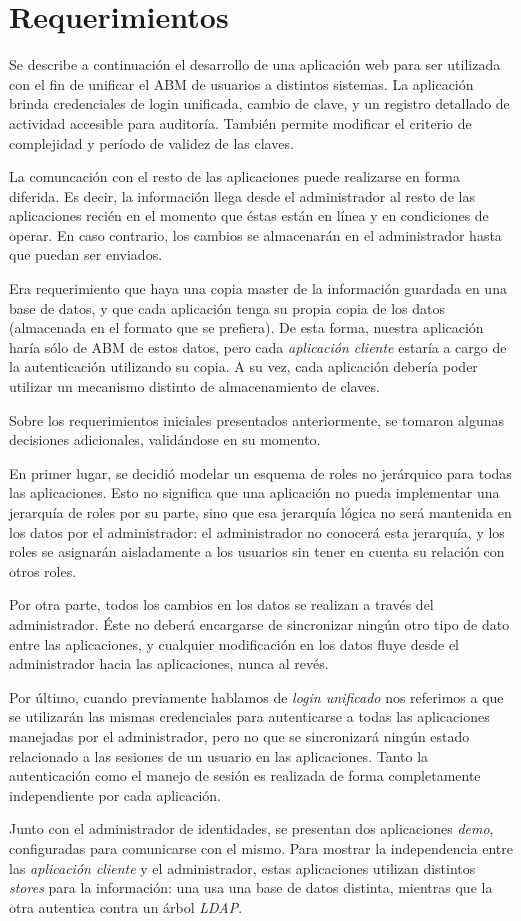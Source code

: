 \section{Requerimientos}

Se describe a continuación el desarrollo de una aplicación web para ser utilizada con el fin de
unificar el ABM de usuarios a distintos sistemas. La aplicación brinda credenciales de login unificada,
cambio de clave, y un registro detallado de actividad accesible para auditoría. También permite modificar
el criterio de complejidad y período de validez de las claves.

La comuncación con el resto de las aplicaciones puede realizarse en forma diferida. Es decir, la información
llega desde el administrador al resto de las aplicaciones recién en el momento que éstas están en línea
y en condiciones de operar. En caso contrario, los cambios se almacenarán en el administrador hasta
que puedan ser enviados.

Era requerimiento que haya una copia master de la información guardada en una base de datos, y que cada
aplicación tenga su propia copia de los datos (almacenada en el formato que se prefiera). De esta forma,
nuestra aplicación haría sólo de ABM de estos datos, pero cada \textit{aplicación cliente} estaría a cargo 
de la autenticación utilizando su copia. A su vez, cada aplicación debería poder utilizar un mecanismo distinto
de almacenamiento de claves.

Sobre los requerimientos iniciales presentados anteriormente, se tomaron algunas decisiones adicionales,
validándose en su momento.

En primer lugar, se decidió modelar un esquema de roles no jerárquico para todas las aplicaciones. Esto no
significa que una aplicación no pueda implementar una jerarquía de roles por su parte, sino que esa jerarquía
lógica no será mantenida en los datos por el administrador: el administrador no conocerá esta jerarquía, y los
roles se asignarán aisladamente a los usuarios sin tener en cuenta su relación con otros roles.

Por otra parte, todos los cambios en los datos se realizan a través del administrador. Éste no deberá encargarse
de sincronizar ningún otro tipo de dato entre las aplicaciones, y cualquier modificación en los datos fluye
desde el administrador hacia las aplicaciones, nunca al revés.

Por último, cuando previamente hablamos de \textit{login unificado} nos referimos a que se utilizarán las mismas
credenciales para autenticarse a todas las aplicaciones manejadas por el administrador, pero no que se sincronizará
ningún estado relacionado a las sesiones de un usuario en las aplicaciones. Tanto la autenticación como el manejo
de sesión es realizada de forma completamente independiente por cada aplicación.

Junto con el administrador de identidades, se presentan dos aplicaciones \textit{demo}, configuradas para 
comunicarse con el mismo. Para mostrar la independencia entre las \textit{aplicación cliente} y el administrador,
estas aplicaciones utilizan distintos \textit{stores} para la información: una usa una base de datos distinta,
mientras que la otra autentica contra un árbol \textit{LDAP}.
